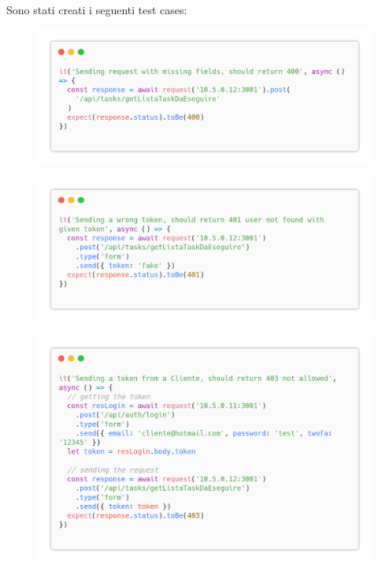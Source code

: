 \documentclass{report}
\begin{document}
Sono stati creati i seguenti test cases:
\begin{figure}[H]
	\centering\includegraphics[width=1\textwidth]{images/code_da_eseguire_test1.png}
\end{figure}
\begin{figure}[H]
	\centering\includegraphics[width=1\textwidth]{images/code_da_eseguire_test2.png}
\end{figure}
\begin{figure}[H]
	\centering\includegraphics[width=1\textwidth]{images/code_da_eseguire_test3.png}
\end{figure}
\end{document}
